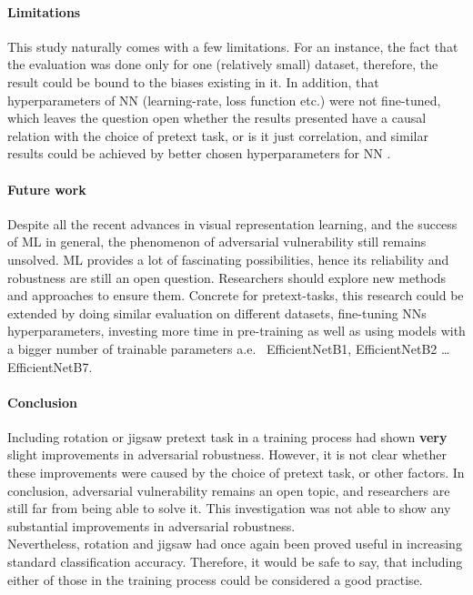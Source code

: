 \paragraph{Limitations}This study naturally comes with a few limitations.
For an instance, the fact that the evaluation was done only for one (relatively small) dataset,
therefore, the result could be bound to the biases existing in it.
In addition, that hyperparameters of NN (learning-rate, loss function etc.)
were not fine-tuned, which leaves the question open whether the
results presented have a causal relation with the choice of pretext task, or is it just correlation,
and similar results could be achieved by better chosen hyperparameters for NN .

\paragraph{Future work}
Despite all the recent advances in visual representation learning, and the success of ML in general, the phenomenon of
adversarial vulnerability still remains unsolved.
ML provides a lot of fascinating possibilities, hence its reliability and robustness are still an open question.
Researchers should explore new methods and approaches to ensure them.
Concrete for pretext-tasks, this research could be extended by doing similar evaluation on different datasets,
fine-tuning NNs hyperparameters,
investing more time in pre-training as well as using models with a bigger number of trainable parameters
a.e. \ EfficientNetB1, EfficientNetB2 \ldots EfficientNetB7.

\paragraph{Conclusion}
Including rotation or jigsaw pretext task in a training process had shown \textbf{very} slight improvements in adversarial robustness.
However, it is not clear whether these improvements were caused by the choice of pretext task, or other factors.
In conclusion, adversarial vulnerability remains an open topic,
and researchers are still far from being able to solve it.
This investigation was not able to show any substantial improvements in adversarial robustness.
\\
Nevertheless, rotation and jigsaw had once again been proved useful in increasing standard classification accuracy.
Therefore, it would be safe to say,
that including either of those in the training process could be considered a good practise.


